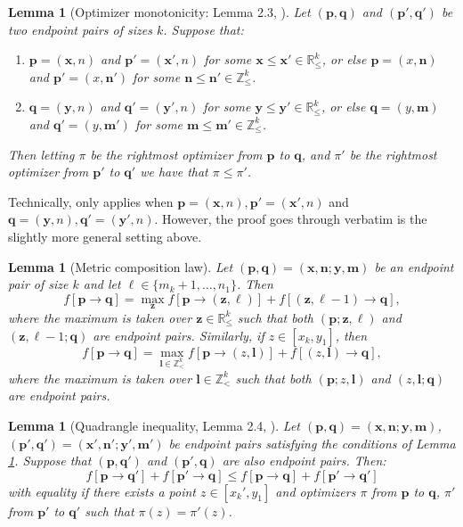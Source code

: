 \documentclass[11pt]{article}
\newcommand{\Z}{\mathbb{Z}}
\newcommand{\R}{\mathbb{R}}
\newcommand{\bx}{\mathbf{x}}
\newcommand{\bn}{\mathbf{n}}
\newcommand{\bm}{\mathbf{m}}
\newcommand{\by}{\mathbf{y}}
\newcommand{\bz}{\mathbf{z}}
\newcommand{\bp}{\mathbf{p}}
\newcommand{\bq}{\mathbf{q}}
\newtheorem{lemma}[theorem]{Lemma}
\theoremstyle{definition} %
\theoremstyle{remark} %
\begin{document}
\begin{lemma}[Optimizer monotonicity: Lemma 2.3, \cite{dauvergne2021disjoint}]
	\label{L:mono-tree-multi-path}
	Let $(\bp, \bq)$ and $(\bp', \bq')$ be two endpoint pairs of sizes $k$. Suppose that:
	\begin{enumerate}
		\item $\bp = (\bx, n)$ and $\bp' = (\bx', n)$ for some $\bx \le \bx' \in \R^k_\le$, or else $\bp = (x, \bn)$ and $\bp' = (x, \bn')$ for some $\bn \le \bn' \in \Z^k_\le$.
		\item $\bq = (\by, n)$ and $\bq' = (\by', n)$ for some $\by \le \by' \in \R^k_\le$, or else $\bq = (y, \bm)$ and $\bq' = (y, \bm')$ for some $\bm \le \bm' \in \Z^k_\le$.
	\end{enumerate} 
	Then letting $\pi$ be the rightmost optimizer from $\bp$ to $\bq$, and $\pi'$ be the rightmost optimizer from $\bp'$ to $\bq'$ we have that $\pi \le \pi'$.
\end{lemma}
Technically, \cite[Lemma 2.2]{dauvergne2021disjoint} only applies when $\bp = (\bx, n), \bp' = (\bx', n)$ and $\bq = (\by, n), \bq' = (\by', n)$. However, the proof goes through verbatim is the slightly more general setting above.

\begin{lemma}[Metric composition law]
	\label{L:split-path}
	Let $(\bp, \bq) = (\bx, \bn; \by, \bm)$ be an endpoint pair of size $k$ and let $\ell \in \{m_k + 1, \dots, n_1\}$. Then
	$$
	f[\bp \to \bq] = \max_\bz f[\bp \to (\bz, \ell)] +  f[(\bz, \ell - 1) \to \bq],
	$$
	where the maximum is taken over $\bz \in \R^k_\le$ such that both $(\bp; \bz, \ell)$ and $(\bz, \ell - 1; \bq)$ are endpoint pairs. Similarly, if $z \in [x_k, y_1]$, then
	$$
	f[\bp \to \bq] = \max_{\mathbf{l} \in \Z^k_<} f[\bp \to (z, \mathbf{l})] +  f[(z, \mathbf{l}) \to \bq],
	$$
	where the maximum is taken over $\mathbf{l} \in \Z^k_<$ such that both $(\bp; z, \mathbf{l})$ and $(z, \mathbf{l}; \bq)$ are endpoint pairs.
\end{lemma}

\begin{lemma}[Quadrangle inequality, Lemma 2.4, \cite{dauvergne2021disjoint}]
	\label{L:quadrangle}
	Let $(\bp, \bq) = (\bx, \bn; \by, \bm)$, $(\bp', \bq') = (\bx', \bn'; \by', \bm')$ be endpoint pairs satisfying the conditions of Lemma \ref{L:mono-tree-multi-path}. Suppose that $(\bp, \bq')$ and $(\bp', \bq)$ are also endpoint pairs. Then:
	$$
	f[\bp \to \bq'] + f[\bp' \to \bq] \le f[\bp \to \bq] + f[\bp' \to \bq']
	$$
	with equality if there exists a point $z \in [x_k', y_1]$ and optimizers $\pi$ from $\bp$ to $\bq$, $\pi'$ from $\bp'$ to $\bq'$ such that $\pi(z) = \pi'(z)$.
\end{lemma}
\end{document}
